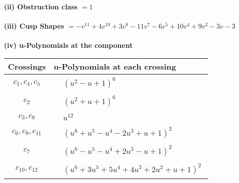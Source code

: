 \documentclass[1p]{elsarticle_modified}
\theoremstyle{definition}
\begin{document}
\flushleft \textbf{(ii) Obstruction class $= 1$}\\~\\
\flushleft \textbf{(iii) Cusp Shapes $= - v^{11}+4 v^{10}+3 v^8-11 v^7-6 v^5+10 v^4+9 v^2-3 v-3$}\\~\\
\newpage\renewcommand{\arraystretch}{1}
\flushleft \textbf{(iv) u-Polynomials at the component}\newline \\
\begin{tabular}{m{50pt}|m{274pt}}
Crossings & \hspace{64pt}u-Polynomials at each crossing \\
\hline $$\begin{aligned}c_{1},c_{4},c_{5}\end{aligned}$$&$\begin{aligned}
&(u^2- u+1)^6
\end{aligned}$\\
\hline $$\begin{aligned}c_{2}\end{aligned}$$&$\begin{aligned}
&(u^2+u+1)^6
\end{aligned}$\\
\hline $$\begin{aligned}c_{3},c_{8}\end{aligned}$$&$\begin{aligned}
&u^{12}
\end{aligned}$\\
\hline $$\begin{aligned}c_{6},c_{9},c_{11}\end{aligned}$$&$\begin{aligned}
&(u^6+u^5- u^4-2 u^3+u+1)^2
\end{aligned}$\\
\hline $$\begin{aligned}c_{7}\end{aligned}$$&$\begin{aligned}
&(u^6- u^5- u^4+2 u^3- u+1)^2
\end{aligned}$\\
\hline $$\begin{aligned}c_{10},c_{12}\end{aligned}$$&$\begin{aligned}
&(u^6+3 u^5+5 u^4+4 u^3+2 u^2+u+1)^2
\end{aligned}$\\
\hline
\end{tabular}\\~\\
\end{document}
